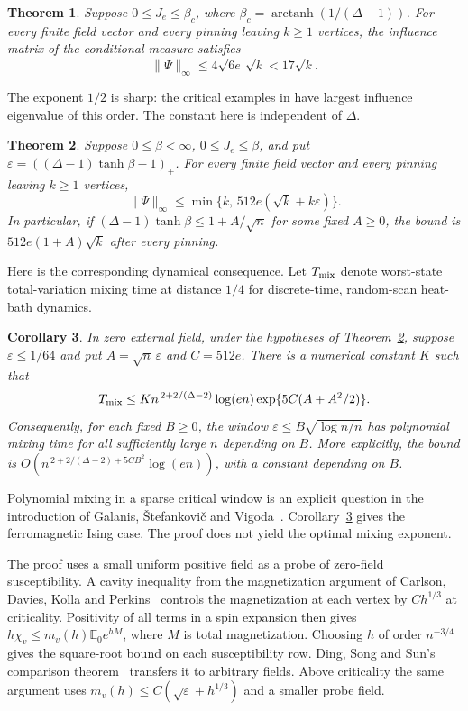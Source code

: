 \documentclass[11pt]{article}
\newtheorem{theorem}{Theorem}[section]
\newtheorem{corollary}[theorem]{Corollary}
\theoremstyle{remark}
\newcommand{\E}{\mathbb E}
\newcommand{\arctanh}{\operatorname{arctanh}}
\begin{document}
\begin{theorem}\label{thm:critical}
Suppose $0\le J_e\le\beta_c$, where
$\beta_c=\arctanh(1/(\Delta-1))$.
For every finite field vector and every pinning leaving $k\ge1$ vertices,
the influence matrix of the conditional measure satisfies
\[
 \|\Psi\|_\infty\le4\sqrt{6e}\,\sqrt k<17\sqrt k .
\]
\end{theorem}

The exponent $1/2$ is sharp: the critical examples in
\cite[Corollary~5.3]{CCYZ} have largest influence eigenvalue of this
order. The constant here is independent of $\Delta$.

\begin{theorem}\label{thm:crossover}
Suppose $0\le\beta<\infty$, $0\le J_e\le\beta$, and put
$\varepsilon=((\Delta-1)\tanh\beta-1)_+$.
For every finite field vector and every pinning leaving $k\ge1$ vertices,
\begin{equation}\label{eq:crossover}
 \|\Psi\|_\infty
       \le \min\{k,\,512e(\sqrt k+k\varepsilon)\}.
\end{equation}
In particular, if
$(\Delta-1)\tanh\beta\le1+A/\sqrt n$ for some fixed $A\ge0$,
the bound is $512e(1+A)\sqrt k$ after every pinning.
\end{theorem}

Here is the corresponding dynamical consequence.
Let $T_{\rm mix}$ denote worst-state total-variation mixing time at
distance $1/4$ for discrete-time, random-scan heat-bath dynamics.
\begin{corollary}\label{cor:mixing}
In zero external field, under the hypotheses of
Theorem~\ref{thm:crossover}, suppose $\varepsilon\le1/64$ and put
$A=\sqrt n\,\varepsilon$ and $C=512e$.
There is a numerical constant $K$ such that
\[
 T_{\rm mix}\le
 K n^{\,2+2/(\Delta-2)}\log(en)
            \exp\{5C(A+A^2/2)\}.
\]
Consequently, for each fixed $B\ge0$, the window
$\varepsilon\le B\sqrt{\log n/n}$ has polynomial mixing time for all
sufficiently large $n$ depending on $B$.
More explicitly, the bound is
$O(n^{\,2+2/(\Delta-2)+5CB^2}\log(en))$, with a constant depending on $B$.
\end{corollary}

Polynomial mixing in a sparse critical window is an explicit question
in the introduction of Galanis, \v{S}tefankovi\v{c} and Vigoda~\cite{GSV}.
Corollary~\ref{cor:mixing} gives the ferromagnetic Ising case.
The proof does not yield the optimal mixing exponent.

The proof uses a small uniform positive field as a probe of zero-field
susceptibility. A cavity inequality from the magnetization argument of
Carlson, Davies, Kolla and Perkins~\cite{CDKP} controls the magnetization
at each vertex by $Ch^{1/3}$ at criticality.
Positivity of all terms in a spin expansion then gives
$h\chi_v\le m_v(h)\E_0e^{hM}$, where $M$ is total magnetization.
Choosing $h$ of order $n^{-3/4}$ gives the square-root bound on
each susceptibility row. Ding, Song and Sun's comparison
theorem~\cite{DSS} transfers it to arbitrary fields.
Above criticality the same argument uses
$m_v(h)\le C(\sqrt\varepsilon+h^{1/3})$ and a smaller probe field.
\end{document}
